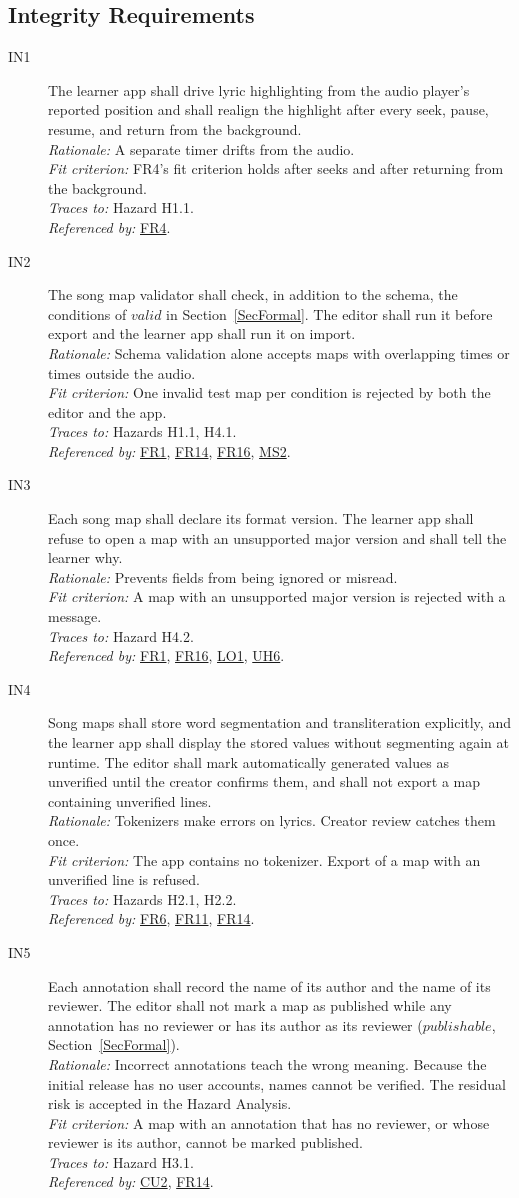 \documentclass[12pt]{article}
\newcommand{\rat}[1]{\\\textit{Rationale:} #1}
\newcommand{\fit}[1]{\\\textit{Fit criterion:} #1}
\newcommand{\trace}[1]{\\\textit{Traces to:} #1}
\newcommand{\usedby}[1]{\\\textit{Referenced by:} #1}
\newcommand{\reqdef}[1]{\hypertarget{req:#1}{#1}}
\newcommand{\req}[1]{\hyperlink{req:#1}{#1}}
\begin{document}
\subsection{Integrity Requirements}
\begin{description}
\item[\reqdef{IN1}] The learner app shall drive lyric highlighting from the audio
player's reported position and shall realign the highlight after every seek,
pause, resume, and return from the background.
\rat{A separate timer drifts from the audio.}
\fit{FR4's fit criterion holds after seeks and after returning from the
background.}
\trace{Hazard H1.1.}
\usedby{\req{FR4}.}

\item[\reqdef{IN2}] The song map validator shall check, in addition to the schema, the
conditions of $\mathit{valid}$ in Section~\ref{SecFormal}. The editor shall run
it before export and the learner app shall run it on import.
\rat{Schema validation alone accepts maps with overlapping times or times outside the audio.}
\fit{One invalid test map per condition is rejected by both the editor and the
app.}
\trace{Hazards H1.1, H4.1.}
\usedby{\req{FR1}, \req{FR14}, \req{FR16}, \req{MS2}.}

\item[\reqdef{IN3}] Each song map shall declare its format version. The learner app
shall refuse to open a map with an unsupported major version and shall tell
the learner why.
\rat{Prevents fields from being ignored or misread.}
\fit{A map with an unsupported major version is rejected with a message.}
\trace{Hazard H4.2.}
\usedby{\req{FR1}, \req{FR16}, \req{LO1}, \req{UH6}.}

\item[\reqdef{IN4}] Song maps shall store word segmentation and transliteration
explicitly, and the learner app shall display the stored values without segmenting again at runtime. The editor shall mark automatically generated values
as unverified until the creator confirms them, and shall not export a map
containing unverified lines.
\rat{Tokenizers make errors on lyrics. Creator review catches them once.}
\fit{The app contains no tokenizer. Export of a map with an unverified line is
refused.}
\trace{Hazards H2.1, H2.2.}
\usedby{\req{FR6}, \req{FR11}, \req{FR14}.}

\item[\reqdef{IN5}] Each annotation shall record the name of its author and the name
of its reviewer. The editor shall not mark a map as published while any
annotation has no reviewer or has its author as its reviewer
($\mathit{publishable}$, Section~\ref{SecFormal}).
\rat{Incorrect annotations teach the wrong meaning. Because the initial release
has no user accounts, names cannot be verified. The residual risk is accepted
in the Hazard Analysis.}
\fit{A map with an annotation that has no reviewer, or whose reviewer is its
author, cannot be marked published.}
\trace{Hazard H3.1.}
\usedby{\req{CU2}, \req{FR14}.}


\end{description}
\end{document}
